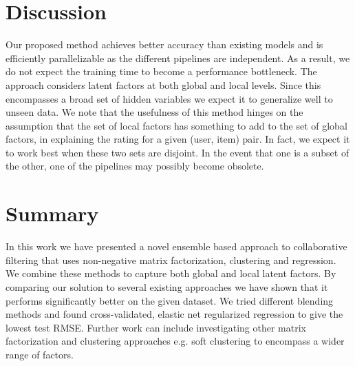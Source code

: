 \documentclass[10pt,conference,compsocconf]{IEEEtran}
\begin{document}
 


%

\section{Discussion}\label{sec:discussion}
Our proposed method achieves better accuracy than existing models and is efficiently parallelizable as the different pipelines are independent. As a result, we do not expect the training time to become a performance bottleneck. The approach considers latent factors at both global and local levels. Since this encompasses a broad set of hidden variables we expect it to generalize well to unseen data.
We note that the usefulness of this method hinges on the assumption that the set of local factors has something to add to the set of global factors, in explaining the rating for a given (user, item) pair. In fact, we expect it to work best when these two sets are disjoint. In the event that one is a subset of the other, one of the pipelines may possibly become obsolete. 

\section{Summary} 
In this work we have presented a novel ensemble based approach to collaborative filtering that uses non-negative matrix factorization, clustering and regression. We combine these methods to capture both global and local latent factors. By comparing our solution to several existing approaches we have shown that it performs significantly better on the given dataset. We tried different blending methods and found cross-validated, elastic net regularized regression to give the lowest test RMSE. Further work can include investigating other matrix factorization and clustering approaches e.g. soft clustering to encompass a wider range of factors.



\end{document}

